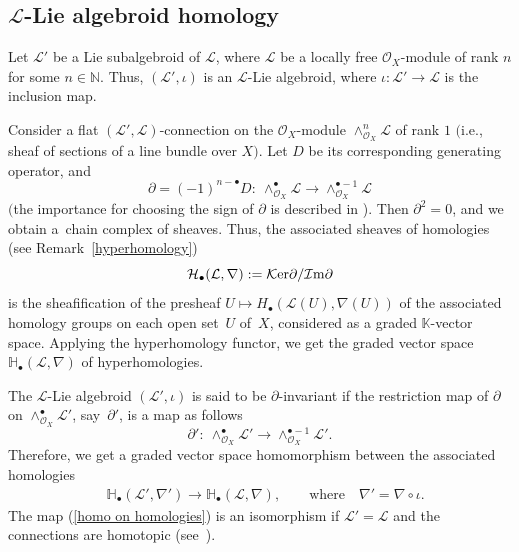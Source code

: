 \documentclass[pdftex]{sigma}
\numberwithin{equation}{section}
\theoremstyle{definition}
\begin{document}
\subsection[L-Lie algebroid homology]{$\boldsymbol{\mathcal{L}}$-Lie algebroid homology}

Let $\mathcal{L}'$ be a Lie subalgebroid of $\mathcal{L}$, where $\mathcal{L}$ be a locally free $\mathcal{O}_X$-module of rank $n$ for some $n \in \mathbb{N}$. Thus, $(\mathcal{L}', \iota)$ is an $\mathcal{L}$-Lie algebroid, where $\iota\colon \mathcal{L}' \rightarrow \mathcal{L}$ is the inclusion map.

Consider a flat $(\mathcal{L}', \mathcal{L})$-connection on the $\mathcal{O}_X$-module $\wedge^{n}_{\mathcal{O}_X}\mathcal{L}$ of rank $1$ $($i.e., sheaf of sections of a line bundle over $X)$.
Let $D$ be its corresponding generating operator, and
\[
\partial= (-1)^{n-\bullet} D\colon \ \wedge^{\bullet}_{\mathcal{O}_X} \mathcal{L} \rightarrow \wedge^{\bullet -1}_{\mathcal{O}_X} \mathcal{L}
\]
$($the importance for choosing the sign of $\partial$ is described in \cite{PX}). Then $\partial^2=0$, and we obtain a~chain complex of sheaves. Thus, the associated sheaves of homologies (see Remark~\ref{hyperhomology})
\[
\mathcal{H}_{\bullet}(\mathcal{L}, \nabla):=\mathcal{K}{\rm er} \partial/{\mathcal{I}{\rm m} \partial}
\] is the sheafification of the presheaf
$U \mapsto H_{\bullet} (\mathcal{L}(U), \nabla(U))$
of the associated homology groups on each open set~$U$ of~$X$, considered as a graded $\mathbb{K}$-vector space. Applying the hyperhomology functor, we get
the graded vector space $\mathbb{H}_{\bullet}(\mathcal{L}, \nabla)$ of hyperhomologies.

The $\mathcal{L}$-Lie algebroid $(\mathcal{L}', \iota)$ is said to be $\partial$-invariant if the restriction map of $\partial$
on $\wedge^{\bullet}_{\mathcal{O}_X} \mathcal{L}'$, say~$\partial'$, is a map as follows
\[
\partial'\colon \ \wedge^{\bullet}_{\mathcal{O}_X} \mathcal{L}' \rightarrow \wedge^{\bullet -1}_{\mathcal{O}_X} \mathcal{L}'.
\]
Therefore, we get a graded vector space homomorphism between the associated homologies
\begin{align} \label{homo on homologies}
&\mathbb{H}_{\bullet}(\mathcal{L}', \nabla') \rightarrow \mathbb{H}_{\bullet}(\mathcal{L}, \nabla), \qquad \text{where}\quad \nabla'= \nabla \circ \iota.
\end{align}
 The map (\ref{homo on homologies}) is an isomorphism if $\mathcal{L}'= \mathcal{L}$ and the connections are homotopic (see~\cite{PX}).
\end{document}
